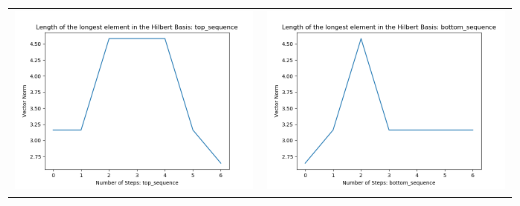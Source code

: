 \documentclass[10pt]{article}
\begin{document}
\begin{tabular}{c|c}
\begin{minipage}{.45\textwidth}
\includegraphics[width=\textwidth]{"DATA/5d/6 generators 1 bound I/top_sequence LENGTH"}
\end{minipage} &
\begin{minipage}{.45\textwidth}
\includegraphics[width=\textwidth]{"DATA/5d/6 generators 1 bound I bottomup/bottom_sequence LENGTH"}
\end{minipage}
\end{tabular}
\end{document}
